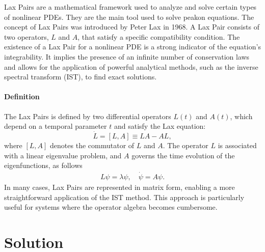 \documentclass[english,master]{liumaiex}
\theoremstyle{plain}
\theoremstyle{definition}
\begin{document}
Lax Pairs are a mathematical framework used to analyze and solve certain types of nonlinear PDEs. They are the main tool used to solve peakon equations. The concept of Lax Pairs was introduced by Peter Lax in 1968\cite{Lax_1968}. A Lax Pair consists of two operators, $L$ and $A$, that satisfy a specific compatibility condition.
The existence of a Lax Pair for a nonlinear PDE is a strong indicator of the equation's integrability. It implies the presence of an infinite number of conservation laws and allows for the application of powerful analytical methods, such as the inverse spectral transform (IST), to find exact solutions.

\subsubsection{Definition}

The Lax Pairs is defined by two differential operators $L(t)$ and $A(t)$, which depend on a temporal parameter $t$ and satisfy the Lax equation:
\begin{equation}
    \dot{L} = [L,A] \equiv LA - AL,
\end{equation}
where $[L, A]$ denotes the commutator of $L$ and $A$. The operator $L$ is associated with a linear eigenvalue problem, and $A$ governs the time evolution of the eigenfunctions, as follows
\begin{align}
    L\psi = \lambda\psi, \quad \dot{\psi} = A\psi.
\end{align}
%
In many cases, Lax Pairs are represented in matrix form, enabling a more straightforward application of the IST method. This approach is particularly useful for systems where the operator algebra becomes cumbersome.

\chapter{Solution}
\end{document}

